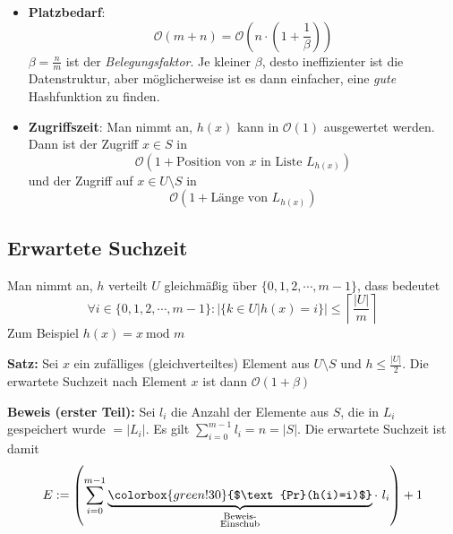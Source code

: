 \documentclass{scrartcl}%
\begin{document}
    \begin{itemize}
        \item \textsf{\textbf{Platzbedarf}}:
        \begin{equation*}
            \mathcal{O}(m+n) =  \mathcal{O}\left(n \cdot \left(1+\frac{1}{\beta}\right)\right)
        \end{equation*}
        $\beta=\frac{n}{m}$ ist der \textit{Belegungsfaktor}.
        Je kleiner $\beta$, desto ineffizienter ist die Datenstruktur, aber möglicherweise ist es dann einfacher, eine \textit{gute} Hashfunktion zu finden.
        \item \textsf{\textbf{Zugriffszeit}}: Man nimmt an, $h(x)$ kann in $\mathcal{O}(1)$ ausgewertet werden.
        Dann ist der Zugriff $x \in S$ in
        \begin{equation*}
            \mathcal{O}(1 + \text{Position von $x$ in Liste } L_{h(x)})
        \end{equation*}
        und der Zugriff auf $x \in U\setminus S$ in
        \begin{equation*}
            \mathcal{O}(1 + \text{Länge von } L_{h(x)})
        \end{equation*}
    \end{itemize}

    \subsection*{Erwartete Suchzeit}\label{subsec:erwarteteSuchzeit}
    Man nimmt an, $h$ verteilt $U$ gleichmäßig über $\{0,1,2,\cdots,m-1 \}$, dass bedeutet
    \begin{equation*}
        \forall i \in \{0,1,2,\cdots,m-1 \}: | \{k \in U | h(x)=i\} | \leq \left\lceil\frac{|U|}{m}\right\rceil
    \end{equation*}
    Zum Beispiel $h(x)=x\ \text{mod } m$

    \vspace*{0.3cm}
    \textbf{\textsf{Satz:}} Sei $x$ ein zufälliges (gleichverteiltes) Element aus $U\setminus S$ und $h \leq \frac{|U|}{2}$.
    Die erwartete Suchzeit nach Element $x$ ist dann $\mathcal{O}(1+\beta)$

    \vspace*{0.3cm}
    \textbf{\textsf{Beweis (erster Teil):}} Sei $l_i$ die Anzahl der Elemente aus $S$, die in $L_i$ gespeichert wurde $=|L_i|$.
    Es gilt $\sum_{i=0}^{m-1}l_i=n=|S|$.
    Die erwartete Suchzeit ist damit
    \begin{equation*}
        E:=\left(\sum_{i=0}^{m-1}\underbrace{\colorbox{green!30}{$\text{Pr}(h(i)=i)$}}_{\substack{\text{Beweis-} \\ \text{Einschub}}} \cdot\ l_i\right) + 1
    \end{equation*}
\end{document}
